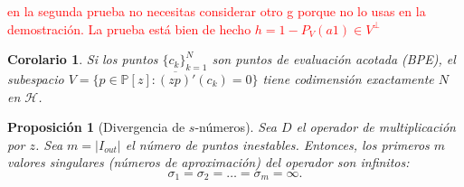 \documentclass[12pt,a4paper]{article}
\newtheorem{corolario}{Corolario}
\newtheorem{proposicion}{Proposición}
\theoremstyle{definition}
\theoremstyle{remark}
\newcommand{\Poly}{\mathbb{P}[z]}
\begin{document}
\textcolor{red}{en la segunda prueba no necesitas considerar otro g porque no lo usas en la demostración. La prueba está bien de hecho $h=1-P_V(a1)\in V^{\perp}$}
\begin{corolario}
    Si los puntos $\{c_k\}_{k=1}^N$ son puntos de evaluación acotada (BPE), el subespacio $V = \overline{\{p \in \Poly : (zp)'(c_k)=0\}}$ tiene codimensión exactamente $N$ en $\mathcal{H}$.
\end{corolario}

\begin{proposicion}[Divergencia de $s$-números]
    \cite{gohberg1969introduction} Sea $D$ el operador de multiplicación por $z$. Sea $m = |I_{out}|$ el número de puntos inestables. Entonces, los primeros $m$ valores singulares (números de aproximación) del operador son infinitos:
    \begin{equation}
        \sigma_1 = \sigma_2 = \dots = \sigma_m = \infty.
    \end{equation}
\end{proposicion}
\end{document}
